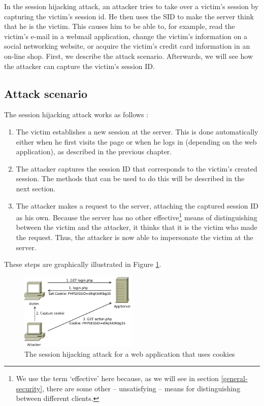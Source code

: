 In the session hijacking attack, an attacker tries to take over a victim's session by capturing the victim's \gls{session id}. He then uses the SID to make the server think that he is the victim. This causes him to be able to, for example, read the victim's e-mail in a webmail application, change the victim's information on a social networking website, or acquire the victim's credit card information in an on-line shop. First, we describe the attack scenario. Afterwards, we will see how the attacker can capture the victim's session ID.

\subsection{Attack scenario}

The session hijacking attack works as follows \cite{Nikiforakis2010}:

\begin{enumerate}
	\item The victim establishes a new session at the server. This is done automatically either when he first visits the page or when he logs in (depending on the web application), as described in the previous chapter.
	\item The attacker captures the session ID that corresponds to the victim's created session. The methods that can be used to do this will be described in the next section.
	\item The attacker makes a request to the server, attaching the captured session ID as his own. Because the server has no other effective\footnote{We use the term `effective' here because, as we will see in section \ref{general-security}, there are some other -- unsatisfying -- means for distinguishing between different clients.} means of distinguishing between the victim and the attacker, it thinks that it is the victim who made the request. Thus, the attacker is now able to impersonate the victim at the server.
\end{enumerate}

These steps are graphically illustrated in Figure \ref{fig:hijacking}.

\begin{figure}[htb]
	\centering
	\includegraphics[width=0.50\textwidth]{img/hijacking.png}
	\caption[The session hijacking attack]{The session hijacking attack for a web application that uses cookies}
	\label{fig:hijacking}
\end{figure}

